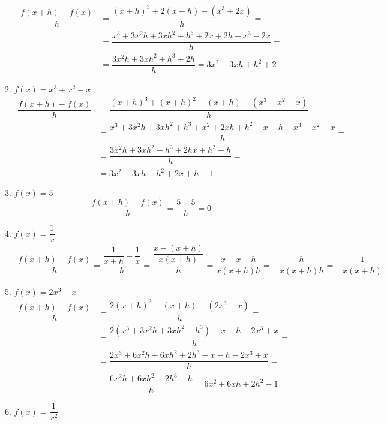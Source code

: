 \begin{enumerate}
\begin{enumerate}
\begin{equation*}
		\begin{split}
		\dfrac{f(x+h)-f(x)}{h}&=\dfrac{(x+h)^3+2(x+h)-(x^3+2x)}{h}=\\
							  &=\dfrac{x^3+3x^2h+3xh^2+h^3+2x+2h-x^3-2x}{h}=\\
							  &=\dfrac{3x^2h+3xh^2+h^3+2h}{h}=3x^2+3xh+h^2+2
		\end{split}
		\end{equation*}		
		\item %
		$f(x)=x^3+x^2-x$
		\begin{equation*}
		\begin{split}
		\dfrac{f(x+h)-f(x)}{h}&=\dfrac{(x+h)^3+(x+h)^2-(x+h)-(x^3+x^2-x)}{h}=\\
							   &=\dfrac{x^3+3x^2h+3xh^2+h^3+x^2+2xh+h^2-x-h-x^3-x^2-x}{h}=\\
							   &=\dfrac{3x^2h+3xh^2+h^3+2hx+h^2-h}{h}=\\
							   &=3x^2+3xh+h^2+2x+h-1
		\end{split}
		\end{equation*}		
		\item %
		$f(x)=5$
		\begin{equation*}
		\dfrac{f(x+h)-f(x)}{h}=\dfrac{5-5}{h}=0
		\end{equation*}		
		\item %
		$f(x)=\dfrac{1}{x}$
		\begin{equation*}
		\begin{split}
		\dfrac{f(x+h)-f(x)}{h}=\dfrac{\dfrac{1}{x+h}-\dfrac{1}{x}}{h}=\dfrac{\dfrac{x-(x+h)}{x(x+h)}}{h}=\dfrac{x-x-h}{x(x+h)h}=-\dfrac{h}{x(x+h)h}=-\dfrac{1}{x(x+h)}
		\end{split}
		\end{equation*}
		\item %
		$f(x)=2x^3-x$
		\begin{equation*}
		\begin{split}
		\dfrac{f(x+h)-f(x)}{h}&=\dfrac{2(x+h)^3-(x+h)-(2x^3-x)}{h}=\\
								&=\dfrac{2(x^3+3x^2h+3xh^2+h^3)-x-h-2x^3+x}{h}=\\
								&=\dfrac{2x^3+6x^2h+6xh^2+2h^3-x-h-2x^3+x}{h}=\\
								&=\dfrac{6x^2h+6xh^2+2h^3-h}{h}=6x^2+6xh+2h^2-1
		\end{split}
		\end{equation*}		
		\item %
		$f(x)=\dfrac{1}{x^2}$
		\begin{equation*}

\end{equation*}
\end{enumerate}
\end{enumerate}
